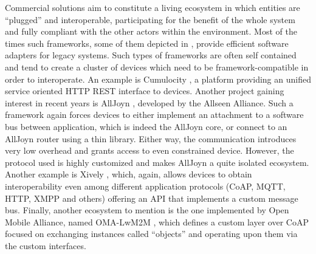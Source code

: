 Commercial solutions aim to constitute a living ecosystem in which entities are ``plugged'' and interoperable, participating for the benefit of the whole system and fully compliant with the other actors within the environment.
Most of the times such frameworks, some of them depicted in \cite{derhamy2015survey}, provide efficient software adapters for legacy systems.
Such types of frameworks are often self contained and tend to create a cluster of devices which need to be framework-compatible in order to interoperate.
An example is Cumulocity \cite{cumulocity}, a platform providing an unified service oriented HTTP REST interface to devices.
Another project gaining interest in recent years is AllJoyn \cite{alljoyn}, developed by the Allseen Alliance.
Such a framework again forces devices to either implement an attachment to a software bus between application, which is indeed the AllJoyn core, or connect to an AllJoyn router using a thin library.
Either way, the communication introduces very low overhead and grants access to even constrained device.
However, the protocol used is highly customized and makes AllJoyn a quite isolated ecosystem.
Another example is Xively \cite{xively}, which, again, allows devices to obtain interoperability even among different application protocols (CoAP, MQTT, HTTP, XMPP and others) offering an API that implements a custom message bus.
Finally, another ecosystem to mention is the one implemented by Open Mobile Alliance, named OMA-LwM2M \cite{omalwm2m}, which defines a custom layer over CoAP focused on exchanging instances called ``objects'' and operating upon them via the custom interfaces.